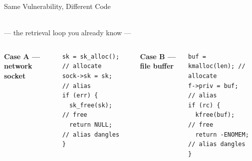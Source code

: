\documentclass[aspectratio=169,10pt]{beamer}
\begin{document}
\begin{frame}[fragile]{Same Vulnerability, Different Code}

  \begin{center}
  \\[2pt]
  {\tiny\textcolor{notecol}{--- the retrieval loop you already know ---}}
  \end{center}

  \vspace{0.1cm}
  \begin{columns}[T]
    \begin{center}\scriptsize\textbf{\textcolor{ccode!70!black}{Case A --- network socket}}\end{center}
    \begin{tcolorbox}[colback=ccode!3, colframe=ccode!45!black, boxrule=0.5pt,
      left=4pt, right=4pt, top=3pt, bottom=3pt, arc=3pt]
    \begin{lstlisting}[style=ccode, basicstyle=\ttfamily\scriptsize\color{black!80},
      keywordstyle=\color{c4}\bfseries, commentstyle=\color{notecol}\itshape]
sk = sk_alloc();    // allocate
sock->sk = sk;      // alias
if (err) {
  sk_free(sk);      // free
  return NULL;      // alias dangles
}
    \end{lstlisting}
    \end{tcolorbox}

    \begin{center}\scriptsize\textbf{\textcolor{csub!70!black}{Case B --- file buffer}}\end{center}
    \begin{tcolorbox}[colback=csub!3, colframe=csub!45!black, boxrule=0.5pt,
      left=4pt, right=4pt, top=3pt, bottom=3pt, arc=3pt]
    \begin{lstlisting}[style=ccode, basicstyle=\ttfamily\scriptsize\color{black!80},
      keywordstyle=\color{c4}\bfseries, commentstyle=\color{notecol}\itshape]
buf = kmalloc(len); // allocate
f->priv = buf;      // alias
if (rc) {
  kfree(buf);       // free
  return -ENOMEM;   // alias dangles
}
    \end{lstlisting}
    \end{tcolorbox}
  \end{columns}


\end{frame}
\end{document}
